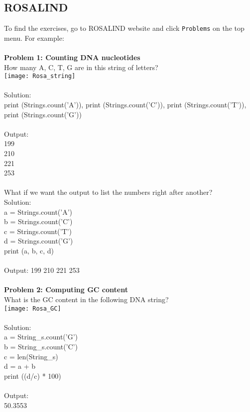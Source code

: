 \documentclass{article}
\begin{document}
{{{\subsection{ROSALIND}
To find the exercises, go to ROSALIND website and click \texttt{Problems} on the top menu. For example:\\
\\
\textbf{Problem 1: Counting DNA nucleotides} \\
How many A, C, T, G are in this string of letters?\\
\texttt{[image: Rosa\_string]}\\
\\
Solution:\\
print (Strings.count('A')), print (Strings.count('C')), print (Strings.count('T')), print (Strings.count('G'))\\
\\
Output:\\
199\\
210\\
221\\
253\\
\\
What if we want the output to list the numbers right after another?\\
Solution: \\
a = Strings.count('A')\\
b = Strings.count('C')\\
c = Strings.count('T')\\
d = Strings.count('G')\\
print (a, b, c, d)\\
\\
Output: 199 210 221 253\\
\\
\textbf{Problem 2: Computing GC content}\\
What is the GC content in the following DNA string?\\
\texttt{[image: Rosa\_GC]}\\
\\
Solution:\\
a = String\_s.count('G')\\
b = String\_s.count('C')\\
c = len(String\_s)\\
d = a + b\\
print ((d/c) * 100)\\
\\
Output:\\
50.3553\\

}}}
\end{document}
